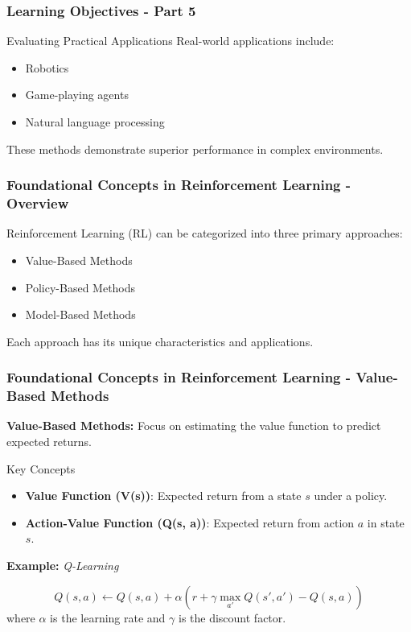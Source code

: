 \documentclass[aspectratio=169]{beamer}
\begin{document}
\begin{frame}[fragile]
    \frametitle{Learning Objectives - Part 5}
    \begin{block}{Evaluating Practical Applications}
        Real-world applications include:
        \begin{itemize}
            \item Robotics
            \item Game-playing agents
            \item Natural language processing
        \end{itemize}
        These methods demonstrate superior performance in complex environments.
    \end{block}
\end{frame}

\begin{frame}[fragile]
    \frametitle{Foundational Concepts in Reinforcement Learning - Overview}
    Reinforcement Learning (RL) can be categorized into three primary approaches:
    
    \begin{itemize}
        \item Value-Based Methods
        \item Policy-Based Methods
        \item Model-Based Methods
    \end{itemize}
    
    Each approach has its unique characteristics and applications.
\end{frame}

\begin{frame}[fragile]
    \frametitle{Foundational Concepts in Reinforcement Learning - Value-Based Methods}
    \textbf{Value-Based Methods:} Focus on estimating the value function to predict expected returns.
    
    \begin{block}{Key Concepts}
        \begin{itemize}
            \item \textbf{Value Function (V(s))}: Expected return from a state $s$ under a policy.
            \item \textbf{Action-Value Function (Q(s, a))}: Expected return from action $a$ in state $s$.
        \end{itemize}
    \end{block}
    
    \textbf{Example:} \textit{Q-Learning}
    
    \begin{equation}
    Q(s, a) \leftarrow Q(s, a) + \alpha \left( r + \gamma \max_{a'} Q(s', a') - Q(s, a) \right) 
    \end{equation}
    where $\alpha$ is the learning rate and $\gamma$ is the discount factor.
\end{frame}
\end{document}

